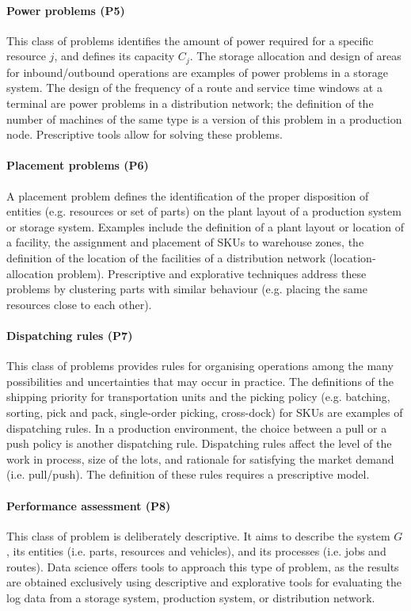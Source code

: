 \paragraph{Power problems (P5)}
This class of problems identifies the amount of power required for a specific resource $j$, and defines its capacity $C_j$. The storage allocation and design of areas for inbound/outbound operations are examples of power problems in a storage system. The design of the frequency of a route and service time windows at a terminal are power problems in a distribution network; the definition of the number of machines of the same type is a version of this problem in a production node. Prescriptive tools allow for solving these problems.

\paragraph{Placement problems (P6)}
A placement problem defines the identification of the proper disposition of entities (e.g. resources or set of parts) on the plant layout of a production system or storage system. Examples include the definition of a plant layout or location of a facility, the assignment and placement of SKUs to warehouse zones, the definition of the location of the facilities of a distribution network (location-allocation problem). Prescriptive and explorative techniques address these problems by clustering parts with similar behaviour (e.g. placing the same resources close to each other). 

\paragraph{Dispatching rules (P7)}
This class of problems provides rules for organising operations among the many possibilities and uncertainties that may occur in practice. The definitions of the shipping priority for transportation units and the picking policy (e.g. batching, sorting, pick and pack, single-order picking, cross-dock) for SKUs are examples of dispatching rules. In a production environment, the choice between a pull or a push policy is another dispatching rule. Dispatching rules affect the level of the work in process, size of the lots, and rationale for satisfying the market demand (i.e. pull/push). The definition of these rules requires a prescriptive model.

\paragraph{Performance assessment (P8)}
This class of problem is deliberately descriptive. It aims to describe the system $G$, its entities (i.e. parts, resources and vehicles), and its processes (i.e. jobs and routes). Data science offers tools to approach this type of problem, as the results are obtained exclusively using descriptive and explorative tools for evaluating the log data from a storage system, production system, or distribution network.

